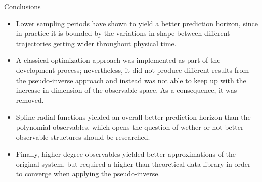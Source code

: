 \documentclass{beamer}
\begin{document}
\begin{frame}{Conclusions}
    \begin{itemize}
        \item Lower sampling periods have shown to yield a better prediction horizon, since in practice it is bounded by the variations in shape between different trajectories getting wider throughout physical time.
        \item A classical optimization approach was implemented as part of the development process; nevertheless, it did not produce different results from the pseudo-inverse approach and instead was not able to keep up with the increase in dimension of the observable space. As a consequence, it was removed.
        \item Spline-radial functions yielded an overall better prediction horizon than the polynomial observables, which opens the question of wether or not better observable structures should be researched.
        \item Finally, higher-degree observables yielded better approximations of the original system, but required a higher than theoretical data library in order to converge when applying the pseudo-inverse.
    \end{itemize}
\end{frame}
\end{document}
